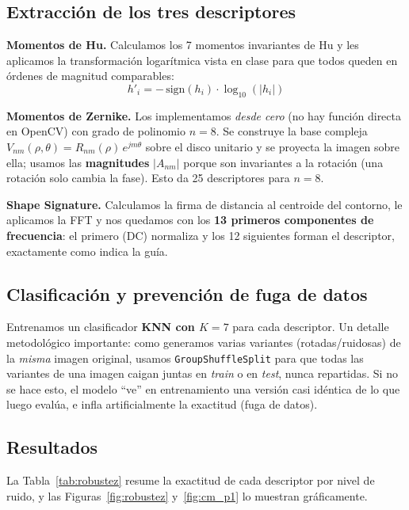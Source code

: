 \documentclass[12pt,a4paper]{article}
\begin{document}
\subsection{Extracción de los tres descriptores}

\textbf{Momentos de Hu.} Calculamos los 7 momentos invariantes de Hu y les aplicamos la transformación logarítmica vista en clase para que todos queden en órdenes de magnitud comparables:
\[
h'_i = -\,\text{sign}(h_i)\cdot \log_{10}(|h_i|)
\]

\textbf{Momentos de Zernike.} Los implementamos \textit{desde cero} (no hay función directa en OpenCV) con grado de polinomio $n=8$. Se construye la base compleja $V_{nm}(\rho,\theta)=R_{nm}(\rho)\,e^{jm\theta}$ sobre el disco unitario y se proyecta la imagen sobre ella; usamos las \textbf{magnitudes} $|A_{nm}|$ porque son invariantes a la rotación (una rotación solo cambia la fase). Esto da 25 descriptores para $n=8$.

\textbf{Shape Signature.} Calculamos la firma de distancia al centroide del contorno, le aplicamos la FFT y nos quedamos con los \textbf{13 primeros componentes de frecuencia}: el primero (DC) normaliza y los 12 siguientes forman el descriptor, exactamente como indica la guía.

\subsection{Clasificación y prevención de fuga de datos}

Entrenamos un clasificador \textbf{KNN con $K=7$} para cada descriptor. Un detalle metodológico importante: como generamos varias variantes (rotadas/ruidosas) de la \textit{misma} imagen original, usamos \texttt{GroupShuffleSplit} para que todas las variantes de una imagen caigan juntas en \textit{train} o en \textit{test}, nunca repartidas. Si no se hace esto, el modelo ``ve'' en entrenamiento una versión casi idéntica de lo que luego evalúa, e infla artificialmente la exactitud (fuga de datos).

\subsection{Resultados}

La Tabla~\ref{tab:robustez} resume la exactitud de cada descriptor por nivel de ruido, y las Figuras~\ref{fig:robustez} y~\ref{fig:cm_p1} lo muestran gráficamente.
\end{document}
